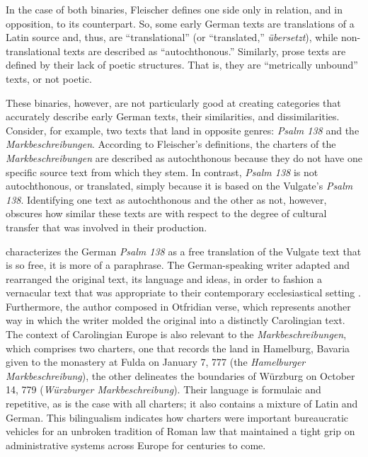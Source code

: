 \noindent In the case of both binaries, Fleischer defines one side only in relation, and in opposition, to its counterpart. So, some early German texts are translations of a Latin source and, thus, are “translational” (or “translated,” \textit{übersetzt}), while non-translational texts are described as “autochthonous.” Similarly, prose texts are defined by their lack of poetic structures. That is, they are “metrically unbound” texts, or not poetic.

\begin{sloppypar}
These binaries, however, are not particularly good at creating categories that accurately describe early German texts, their similarities, and dissimilarities. Consider, for example, two texts that land in opposite genres: \textit{Psalm 138} and the \textit{Markbeschreibungen}. According to Fleischer’s definitions, the charters of the \textit{Markbeschreibungen} are described as autochthonous because they do not have one specific source text from which they stem. In contrast, \textit{Psalm 138} is not autochthonous, or translated, simply because it is based on the Vulgate’s \textit{Psalm 138}. Identifying one text as autochthonous and the other as not, however, obscures how similar these texts are with respect to the degree of cultural transfer that was involved in their production.
\end{sloppypar}

\citet{Bostock1976} characterizes the German \textit{Psalm 138} as a free translation of the Vulgate text that is so free, it is more of a paraphrase. The German-speaking writer adapted and rearranged the original text, its language and ideas, in order to fashion a vernacular text that was appropriate to their contemporary ecclesiastical setting \citep[219--222]{Bostock1976}. Furthermore, the author composed in Otfridian verse, which represents another way in which the writer molded the original into a distinctly Carolingian text. The context of Carolingian Europe is also relevant to the \textit{Markbeschreibungen}, which comprises two charters, one that records the land in Hamelburg, Bavaria given to the monastery at Fulda on January 7, 777 (the \textit{Hamelburger Markbeschreibung}), the other delineates the boundaries of Würzburg on October 14, 779 (\textit{Würzburger Markbeschreibung}). Their language is formulaic and repetitive, as is the case with all charters; it also contains a mixture of Latin and German. This bilingualism indicates how charters were important bureaucratic vehicles for an unbroken tradition of Roman law that maintained a tight grip on administrative systems across Europe for centuries to come.

